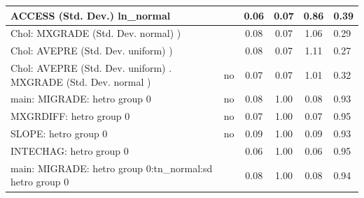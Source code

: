 \begin{table}
\begin{center}
\begin{tabular}{|l|l|c|c|c|l|}
			\hline
			ACCESS (Std. Dev.) ln_normal &  & 0.06 & 0.07 & 0.86 & 0.39 \\
			\hline
			 Chol: MXGRADE (Std. Dev. normal) ) &  & 0.08 & 0.07 & 1.06 & 0.29 \\
			\hline
			 Chol: AVEPRE (Std. Dev. uniform) ) &  & 0.08 & 0.07 & 1.11 & 0.27 \\
			\hline
			 Chol: AVEPRE (Std. Dev. uniform) . MXGRADE (Std. Dev.   normal ) & no & 0.07 & 0.07 & 1.01 & 0.32 \\
			\hline
			main: MIGRADE: hetro group 0 & no & 0.08 & 1.00 & 0.08 & 0.93 \\
			\hline
			MXGRDIFF: hetro group 0 & no & 0.07 & 1.00 & 0.07 & 0.95 \\
			\hline
			SLOPE: hetro group 0 & no & 0.09 & 1.00 & 0.09 & 0.93 \\
			\hline
			INTECHAG: hetro group 0 &  & 0.06 & 1.00 & 0.06 & 0.95 \\
			\hline
			main: MIGRADE: hetro group 0:tn_normal:sd  hetro group 0 &  & 0.08 & 1.00 & 0.08 & 0.94 \\
			\hline
		\end{tabular}
	\end{center}
\end{table}